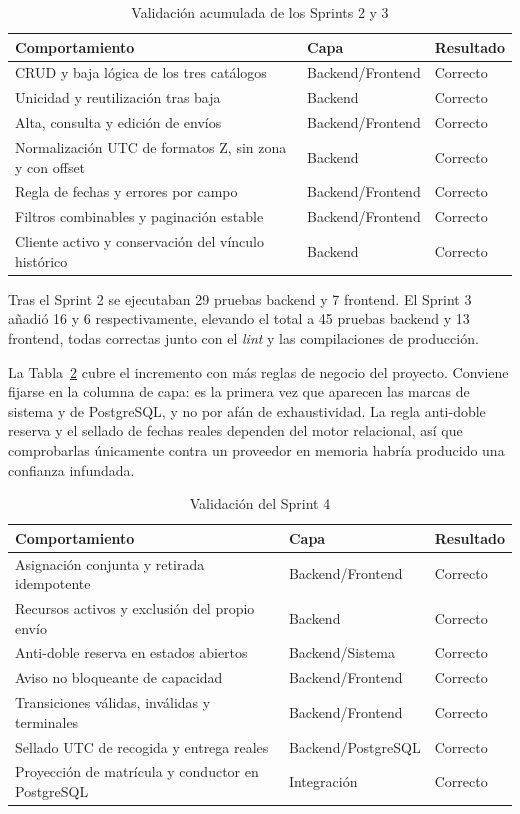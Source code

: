 \begin{table}[htbp]
\centering
\caption{Validación acumulada de los Sprints 2 y 3}
\label{tab:val-s23}
\begin{tabular}{p{5.8cm}p{2.4cm}p{2.5cm}}
\hline Comportamiento & Capa & Resultado \\ \hline
CRUD y baja lógica de los tres catálogos & Backend/\allowbreak Frontend & Correcto \\
Unicidad y reutilización tras baja & Backend & Correcto \\
Alta, consulta y edición de envíos & Backend/\allowbreak Frontend & Correcto \\
Normalización UTC de formatos Z, sin zona y con offset & Backend & Correcto \\
Regla de fechas y errores por campo & Backend/\allowbreak Frontend & Correcto \\
Filtros combinables y paginación estable & Backend/\allowbreak Frontend & Correcto \\
Cliente activo y conservación del vínculo histórico & Backend & Correcto \\
\hline
\end{tabular}
\end{table}

Tras el Sprint 2 se ejecutaban 29 pruebas backend y 7 frontend. El Sprint 3 añadió 16 y 6 respectivamente, elevando el total a 45 pruebas backend y 13 frontend, todas correctas junto con el \emph{lint} y las compilaciones de producción.

La Tabla~\ref{tab:val-s4} cubre el incremento con más reglas de negocio del proyecto. Conviene fijarse en la columna de capa: es la primera vez que aparecen las marcas de sistema y de PostgreSQL, y no por afán de exhaustividad. La regla anti-doble reserva y el sellado de fechas reales dependen del motor relacional, así que comprobarlas únicamente contra un proveedor en memoria habría producido una confianza infundada.

\begin{table}[htbp]
\centering
\caption{Validación del Sprint 4}
\label{tab:val-s4}
\begin{tabular}{p{6.1cm}p{2.2cm}p{2.3cm}}
\hline Comportamiento & Capa & Resultado \\ \hline
Asignación conjunta y retirada idempotente & Backend/\allowbreak Frontend & Correcto \\
Recursos activos y exclusión del propio envío & Backend & Correcto \\
Anti-doble reserva en estados abiertos & Backend/\allowbreak Sistema & Correcto \\
Aviso no bloqueante de capacidad & Backend/\allowbreak Frontend & Correcto \\
Transiciones válidas, inválidas y terminales & Backend/\allowbreak Frontend & Correcto \\
Sellado UTC de recogida y entrega reales & Backend/\allowbreak PostgreSQL & Correcto \\
Proyección de matrícula y conductor en PostgreSQL & Integración & Correcto \\
\hline
\end{tabular}
\end{table}

